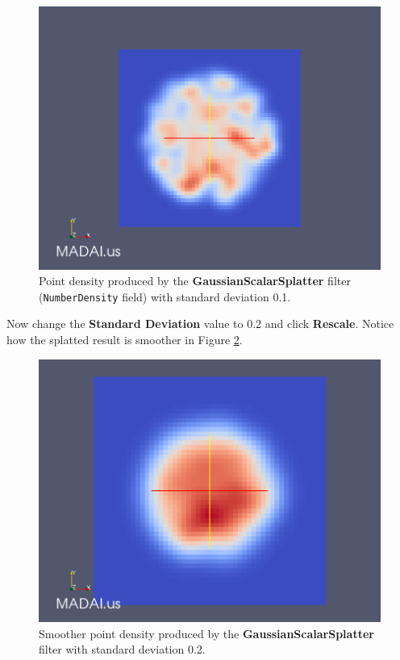 \documentclass[12pt]{article}
\begin{document}
\begin{figure}[htbp]
   \centering
   \includegraphics[scale=.25]{images/GaussianScalarSplatterPoint1.png} %
   \caption{Point density produced by the \textbf{GaussianScalarSplatter} filter (\texttt{NumberDensity} field) with standard deviation 0.1.}
   \label{fig:GaussianScalarSplatter1}
\end{figure}

Now change the \textbf{Standard Deviation} value to 0.2 and click \textbf{Rescale}. Notice how the splatted result is smoother in Figure \ref{fig:GaussianScalarSplatter2}.

\begin{figure}[htbp]
   \centering
   \includegraphics[scale=.25]{images/GaussianScalarSplatterPoint2.png} %
   \caption{Smoother point density produced by the \textbf{GaussianScalarSplatter} filter with standard deviation 0.2.}
   \label{fig:GaussianScalarSplatter2}
\end{figure}
\end{document}
